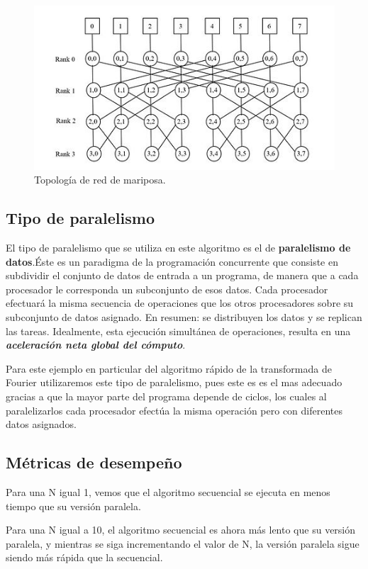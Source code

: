 \documentclass{report}
\begin{document}
\begin{figure}[h!]
    \centering
    \includegraphics[scale=1.4]{Images/Butterfly_Network.jpg}
    \caption{Topología de red de mariposa.}
    \label{Topologia mariposa}
\end{figure}

\clearpage
\subsection*{Tipo de paralelismo}
\noindent El tipo de paralelismo que se utiliza en este algoritmo es el de \textbf{paralelismo de datos}.Éste es un paradigma de la programación concurrente que consiste en subdividir el conjunto de datos de entrada a un programa, de manera que a cada procesador le corresponda un subconjunto de esos datos. Cada procesador efectuará la misma secuencia de operaciones que los otros procesadores sobre su subconjunto de datos asignado. En resumen: se distribuyen los datos y se replican las tareas. Idealmente, esta ejecución simultánea de operaciones, resulta en una \textbf{\textit{aceleración neta global del cómputo}}.\medskip

Para este ejemplo en particular del algoritmo rápido de la transformada de Fourier utilizaremos este tipo de paralelismo, pues este es es el mas adecuado gracias a que la mayor parte del programa depende de ciclos, los cuales al paralelizarlos cada procesador efectúa la misma operación pero con diferentes datos asignados. 

\subsection*{Métricas de desempeño}
Para una N igual 1, vemos que el algoritmo secuencial se ejecuta en menos tiempo que su versión paralela.\medskip

Para una N igual a 10, el algoritmo secuencial es ahora más lento que su versión paralela, y mientras se siga incrementando el valor de N, la versión paralela sigue siendo más rápida que la secuencial.\medskip
\end{document}
